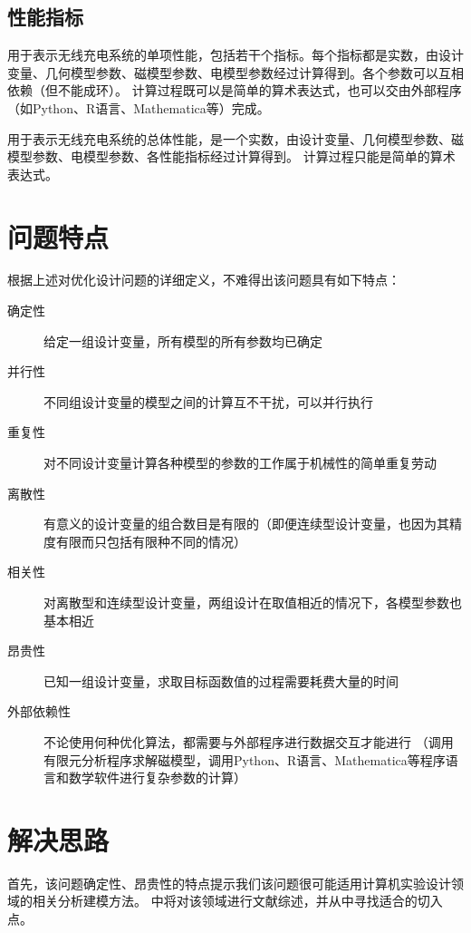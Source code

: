 \documentclass[index]{subfiles}
\begin{document}
\subsection{性能指标}
\begin{definition}[性能指标]
  用于表示无线充电系统的单项性能，包括若干个指标。每个指标都是实数，由设计变量、几何模型参数、磁模型参数、电模型参数经过计算得到。各个参数可以互相依赖（但不能成环）。
  计算过程既可以是简单的算术表达式，也可以交由外部程序（如Python、R语言、Mathematica等）完成。
\end{definition}
\begin{definition}[总体性能指标]
  用于表示无线充电系统的总体性能，是一个实数，由设计变量、几何模型参数、磁模型参数、电模型参数、各性能指标经过计算得到。
  计算过程只能是简单的算术表达式。
\end{definition}

\section{问题特点}\label{sec:fea-fea}
根据上述对优化设计问题的详细定义，不难得出该问题具有如下特点：
\begin{description}
  \item[确定性] 给定一组设计变量，所有模型的所有参数均已确定
  \item[并行性] 不同组设计变量的模型之间的计算互不干扰，可以并行执行
  \item[重复性] 对不同设计变量计算各种模型的参数的工作属于机械性的简单重复劳动
  \item[离散性] 有意义的设计变量的组合数目是有限的（即便连续型设计变量，也因为其精度有限而只包括有限种不同的情况）
  \item[相关性] 对离散型和连续型设计变量，两组设计在取值相近的情况下，各模型参数也基本相近
  \item[昂贵性] 已知一组设计变量，求取目标函数值的过程需要耗费大量的时间
  \item[外部依赖性] 不论使用何种优化算法，都需要与外部程序进行数据交互才能进行
    （调用有限元分析程序求解磁模型，调用Python、R语言、Mathematica等程序语言和数学软件进行复杂参数的计算）
\end{description}

\section{解决思路}
首先，该问题确定性、昂贵性的特点提示我们该问题很可能适用计算机实验设计\cite{sacks1989}领域的相关分析建模方法。
中将对该领域进行文献综述，并从中寻找适合的切入点。
\end{document}
